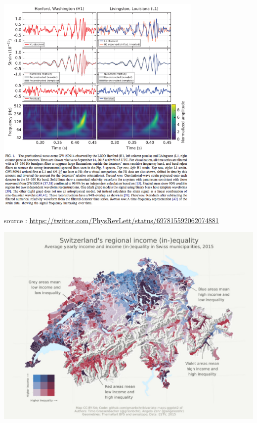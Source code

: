 \documentclass{beamer}
\begin{document}
\begin{frame}
\centering
\includegraphics[width=0.75\textwidth,keepaspectratio]{img/bon_exemple4.png}

\tiny{source : \url{https://twitter.com/PhysRevLett/status/697815592062074881} }
\end{frame}




\begin{frame}
\centering
\includegraphics[width=\textwidth,keepaspectratio]{img/carto_suisse.png}
\end{frame}
\end{document}
